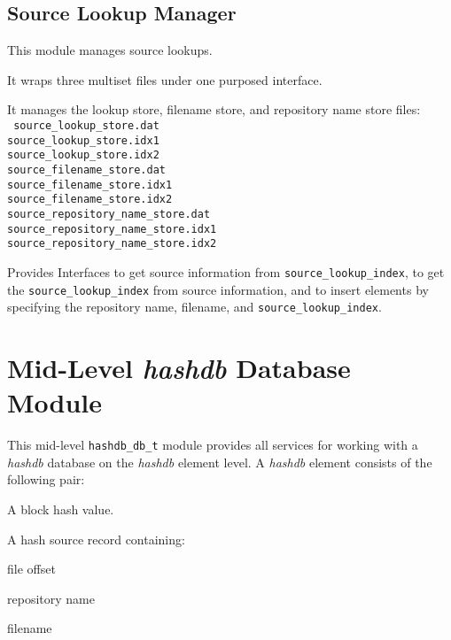 \documentclass[12pt,twoside]{article}
\newcommand{\hdb}{\emph{hashdb}\xspace}
\begin{document}
\subsection{Source Lookup Manager}
This module manages source lookups.
\begin{compactitem}
\item It wraps three multiset files under one purposed interface.
\item It manages the lookup store, filename store,
and repository name store files: \\
\texttt{
source\_lookup\_store.dat \\
source\_lookup\_store.idx1 \\
source\_lookup\_store.idx2 \\
source\_filename\_store.dat \\
source\_filename\_store.idx1 \\
source\_filename\_store.idx2 \\
source\_repository\_name\_store.dat \\
source\_repository\_name\_store.idx1 \\
source\_repository\_name\_store.idx2 \\
}
\item Provides Interfaces to get source information
from \texttt{source\_lookup\_index},
to get the \texttt{source\_lookup\_index} from source information,
and to insert elements by specifying the repository name, filename,
and \texttt{source\_lookup\_index}.
\end{compactitem}

\section{Mid-Level \hdb Database Module}
This mid-level \texttt{hashdb\_db\_t} module
provides all services for working with a \hdb database
on the \hdb element level.
A \hdb element consists of the following pair:
\begin{compactitem}
\item A block hash value.
\item A hash source record containing:
  \begin{compactitem}
  \item file offset
  \item repository name
  \item filename
  \end{compactitem}
\end{compactitem}
\end{document}
